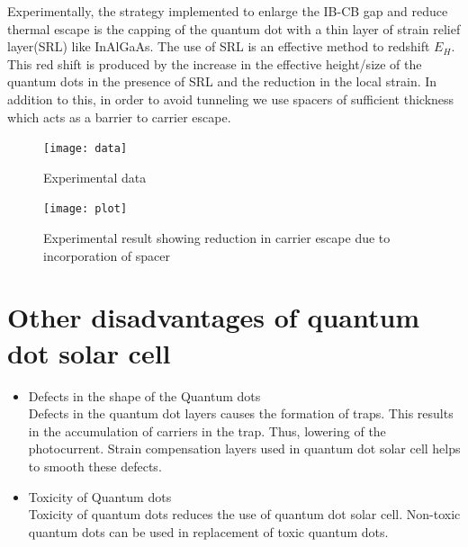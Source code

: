 \documentclass[hidelinks, 12pt]{report}
\begin{document}
Experimentally, the strategy implemented to enlarge the IB-CB gap and reduce thermal escape is the capping of the quantum dot with a thin layer of strain relief layer(SRL) like InAlGaAs. The use of SRL is an effective method to redshift $E_{H}$. This red shift is produced by the increase in the effective height/size of the quantum dots in the presence of SRL and the reduction in the local strain. In addition to this, in order to avoid tunneling we use spacers of sufficient thickness which acts as a barrier to carrier escape. \cite{carrier} \\

\begin{figure}[H]
\centering
\texttt{[image: data]}
\caption[Experimental data]{Experimental data \cite{carrier}}
\label{Experimental data}
\end{figure}

\begin{figure}[H]
\centering
\texttt{[image: plot]}
\caption[Experimental result showing reduction in carrier escape due to incorporation of spacer]{Experimental result showing reduction in carrier escape due to incorporation of spacer \cite{carrier}}
\label{Reduction in carrier escape}
\end{figure}

\section{Other disadvantages of quantum dot solar cell}
\begin{itemize}
\item{Defects in the shape of the Quantum dots}\\
Defects in the quantum dot layers causes the formation of traps. This results in the accumulation of carriers in the trap. Thus, lowering of the photocurrent. Strain compensation layers used in quantum dot solar cell helps to smooth these defects. 
\item{Toxicity of Quantum dots}\\
Toxicity of quantum dots reduces the use of quantum dot solar cell. Non-toxic quantum dots can be used in replacement of toxic quantum dots.
\end{itemize}

\end{document}

